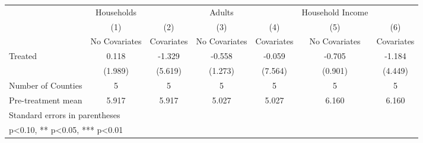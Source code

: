 {
\def\sym#1{\ifmmode^{#1}\else\(^{#1}\)\fi}
\begin{tabular}{l*{6}{c}}
\hline\hline
            &  Households   &               &      Adults   &               &Household Income   &               \\
            &\multicolumn{1}{c}{(1)}&\multicolumn{1}{c}{(2)}&\multicolumn{1}{c}{(3)}&\multicolumn{1}{c}{(4)}&\multicolumn{1}{c}{(5)}&\multicolumn{1}{c}{(6)}\\
            &\multicolumn{1}{c}{No Covariates}&\multicolumn{1}{c}{Covariates}&\multicolumn{1}{c}{No Covariates}&\multicolumn{1}{c}{Covariates}&\multicolumn{1}{c}{No Covariates}&\multicolumn{1}{c}{Covariates}\\
\hline
Treated     &       0.118   &      -1.329   &      -0.558   &      -0.059   &      -0.705   &      -1.184   \\
            &     (1.989)   &     (5.619)   &     (1.273)   &     (7.564)   &     (0.901)   &     (4.449)   \\
\hline
Number of Counties&           5   &           5   &           5   &           5   &           5   &           5   \\
Pre-treatment mean&       5.917   &       5.917   &       5.027   &       5.027   &       6.160   &       6.160   \\
\hline\hline
\multicolumn{7}{l}{\footnotesize Standard errors in parentheses}\\
\multicolumn{7}{l}{\footnotesize * p<0.10, ** p<0.05, *** p<0.01}\\
\end{tabular}
}
